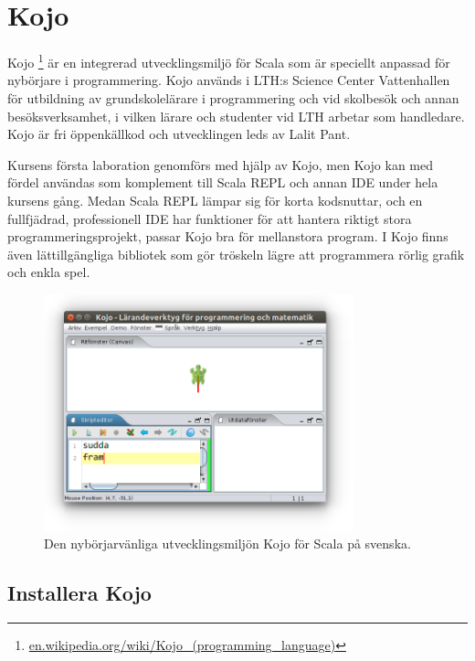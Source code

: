 \newpage

\section{Kojo}\label{appendix:ide:kojo}

Kojo%
\footnote{\href{https://en.wikipedia.org/wiki/Kojo_(programming_language)}{en.wikipedia.org/wiki/Kojo\_(programming\_language)}}
 är en integrerad utvecklingsmiljö för Scala som är speciellt anpassad för nybörjare i programmering. Kojo används i LTH:s Science Center Vattenhallen för utbildning av grundskolelärare i programmering och vid skolbesök och annan besöksverksamhet, i vilken lärare och studenter vid LTH arbetar som handledare. Kojo är fri öppenkällkod och utvecklingen leds av Lalit Pant.

Kursens första laboration genomförs med hjälp av Kojo, men Kojo kan med fördel användas som komplement till Scala REPL och annan IDE under hela kursens gång. Medan Scala REPL lämpar sig för korta kodsnuttar, och en fullfjädrad, professionell IDE har funktioner för att hantera riktigt stora programmeringsprojekt, passar Kojo bra för mellanstora program. I Kojo finns även lättillgängliga bibliotek som gör tröskeln lägre att programmera rörlig grafik och enkla spel.   


\begin{figure}[H]
\centering
\includegraphics[width=0.8\textwidth]{../img/kojo/kojo.png}
\caption{Den nybörjarvänliga utvecklingsmiljön Kojo för Scala på svenska.}
\label{fig:appendix:ide:kojo}
\end{figure} 

\subsection{Installera Kojo}

